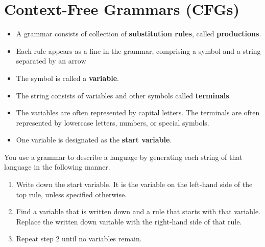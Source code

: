 \documentclass[11pt,a4paper]{article}
\begin{document}
\tableofcontents


\section{Context-Free Grammars (CFGs)}
\begin{itemize}
    \item A grammar consists of collection of \textbf{substitution rules}, called \textbf{productions}.
    \item Each rule appears as a line in the grammar, comprising a symbol and a string separated by an arrow
    \item The symbol is called a \textbf{variable}.
    \item The string consists of variables and other symbols called \textbf{terminals}.
    \item The variables are often represented by capital letters. The terminals are often represented by lowercase letters, numbers, or special symbols.
    \item One variable is designated as the \textbf{start variable}.
\end{itemize}

You use a grammar to describe a language by generating each string of that language in the following manner.
\begin{enumerate}
    \item Write down the start variable. It is the variable on the left-hand side of the top rule, unless specified otherwise.
    \item Find a variable that is written down and a rule that starts with that variable. Replace the written down variable with the right-hand side of that rule.
    \item Repeat step 2 until no variables remain. \\
\end{enumerate}
\end{document}
